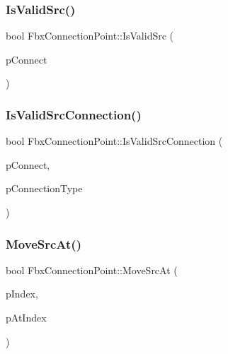 \mbox{\label{class_fbx_connection_point_aed1556396073c8704ea98a6012ae1207}} 
\subsubsection{\texorpdfstring{Is\+Valid\+Src()}{IsValidSrc()}}
{\footnotesize\ttfamily bool Fbx\+Connection\+Point\+::\+Is\+Valid\+Src (\begin{DoxyParamCaption}\item[{\hyperlink{class_fbx_connection_point}{Fbx\+Connection\+Point} $\ast$}]{p\+Connect }\end{DoxyParamCaption})}

\mbox{\label{class_fbx_connection_point_a8a1d3ca37e0bd5aba348746142689127}} 
\subsubsection{\texorpdfstring{Is\+Valid\+Src\+Connection()}{IsValidSrcConnection()}}
{\footnotesize\ttfamily bool Fbx\+Connection\+Point\+::\+Is\+Valid\+Src\+Connection (\begin{DoxyParamCaption}\item[{\hyperlink{class_fbx_connection_point}{Fbx\+Connection\+Point} $\ast$}]{p\+Connect,  }\item[{\hyperlink{class_fbx_connection_a3df448a5db356652ab99fd2be2553749}{Fbx\+Connection\+::\+E\+Type}}]{p\+Connection\+Type }\end{DoxyParamCaption})}

\mbox{\label{class_fbx_connection_point_abc82c5b4c5c5c9b1d4ab59662cb13e7e}} 
\subsubsection{\texorpdfstring{Move\+Src\+At()}{MoveSrcAt()}\hspace{0.1cm}{\footnotesize\ttfamily [1/2]}}
{\footnotesize\ttfamily bool Fbx\+Connection\+Point\+::\+Move\+Src\+At (\begin{DoxyParamCaption}\item[{int}]{p\+Index,  }\item[{int}]{p\+At\+Index }\end{DoxyParamCaption})}

